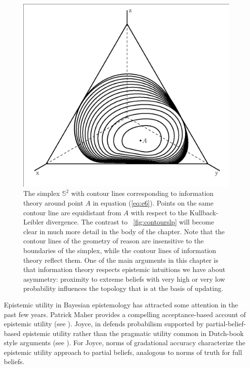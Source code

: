 \documentclass[phd,12pt,oneside]{ubcthesis}
\begin{document}
\begin{figure}[ht!]
    \begin{minipage}[h]{.7\linewidth}
      \includegraphics[width=\textwidth]{crj.eps}
      \caption{\footnotesize The simplex $\mathbb{S}^{2}$ with contour
        lines corresponding to information theory around point $A$ in
        equation (\ref{eq:e6}). Points on the same contour line are
        equidistant from $A$ with respect to the Kullback-Leibler
        divergence. The contrast to {\igure}~\ref{fig:contourslp} will
        become clear in much more detail in the body of the chapter.
        Note that the contour lines of the geometry of reason are
        insensitive to the boundaries of the simplex, while the
        contour lines of information theory reflect them. One of the
        main arguments in this chapter is that information theory
        respects epistemic intuitions we have about asymmetry:
        proximity to extreme beliefs with very high or very low
        probability influences the topology that is at the basis of
        updating.}
      \label{fig:contoursrj}
    \end{minipage}
\end{figure}

Epistemic utility in Bayesian epistemology has attracted some
attention in the past few years. Patrick Maher provides a compelling
acceptance-based account of epistemic utility (see
). Joyce, in  defends probabilism supported by
partial-belief-based epistemic utility rather than the pragmatic
utility common in Dutch-book style arguments (see
). For Joyce, norms of gradational accuracy
characterize the epistemic utility approach to partial beliefs,
analogous to norms of truth for full beliefs.
\end{document}
